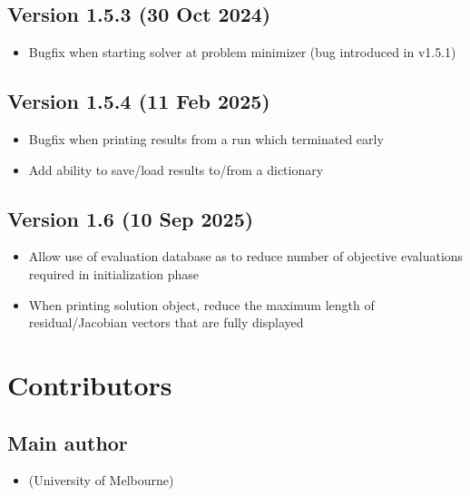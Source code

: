 \documentclass[letterpaper,10pt,english]{sphinxmanual}
\begin{document}
\section{Version 1.5.3 (30 Oct 2024)}
\label{\detokenize{history:version-1-5-3-30-oct-2024}}\begin{itemize}
\item {} 
\sphinxAtStartPar
Bugfix when starting solver at problem minimizer (bug introduced in v1.5.1)

\end{itemize}


\section{Version 1.5.4 (11 Feb 2025)}
\label{\detokenize{history:version-1-5-4-11-feb-2025}}\begin{itemize}
\item {} 
\sphinxAtStartPar
Bugfix when printing results from a run which terminated early

\item {} 
\sphinxAtStartPar
Add ability to save/load results to/from a dictionary

\end{itemize}


\section{Version 1.6 (10 Sep 2025)}
\label{\detokenize{history:version-1-6-10-sep-2025}}\begin{itemize}
\item {} 
\sphinxAtStartPar
Allow use of evaluation database as  to reduce number of objective evaluations required in initialization phase

\item {} 
\sphinxAtStartPar
When printing solution object, reduce the maximum length of residual/Jacobian vectors that are fully displayed

\end{itemize}

\sphinxstepscope


\chapter{Contributors}
\label{\detokenize{contributors:contributors}}\label{\detokenize{contributors::doc}}

\section{Main author}
\label{\detokenize{contributors:main-author}}\begin{itemize}
\item {} 
\sphinxAtStartPar
{} (University of Melbourne)

\end{itemize}
\end{document}
